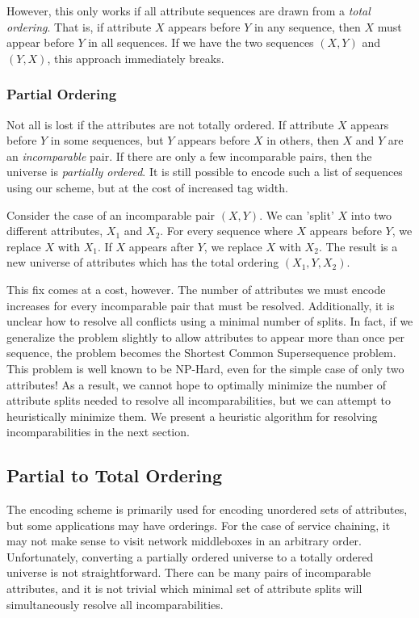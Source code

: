 However, this only works if all attribute sequences are drawn from a \textit{total ordering}. That is, if attribute $X$ appears before $Y$ in any sequence, then $X$ must appear before $Y$ in all sequences. If we have the two sequences $(X, Y)$ and $(Y, X)$, this approach immediately breaks.

\subsubsection{Partial Ordering}
Not all is lost if the attributes are not totally ordered. If attribute $X$ appears before $Y$ in some sequences, but $Y$ appears before $X$ in others, then $X$ and $Y$ are an \textit{incomparable} pair. If there are only a few incomparable pairs, then the universe is \textit{partially ordered}. It is still possible to encode such a list of sequences using our scheme, but at the cost of increased tag width.

Consider the case of an incomparable pair $(X,Y)$. We can 'split' $X$ into two different attributes, $X_1$ and $X_2$. For every sequence where $X$ appears before $Y$, we replace $X$ with $X_1$. If $X$ appears after $Y$, we replace $X$ with $X_2$. The result is a new universe of attributes which has the total ordering $(X_1, Y, X_2)$. 

This fix comes at a cost, however. The number of attributes we must encode increases for every incomparable pair that must be resolved. Additionally, it is unclear how to resolve all conflicts using a minimal number of splits. In fact, if we generalize the problem slightly to allow attributes to appear more than once per sequence, the problem becomes the Shortest Common Supersequence problem. This problem is well known to be NP-Hard, even for the simple case of only two attributes! As a result, we cannot hope to optimally minimize the number of attribute splits needed to resolve all incomparabilities, but we can attempt to heuristically minimize them. We present a heuristic algorithm for resolving incomparabilities in the next section.

\subsection{Partial to Total Ordering}
The encoding scheme is primarily used for encoding unordered sets of attributes, but some applications may have orderings. For the case of service chaining, it may not make sense to visit network middleboxes in an arbitrary order. 
Unfortunately, converting a partially ordered universe to a totally ordered universe is not straightforward. There can be many pairs of incomparable attributes, and it is not trivial which minimal set of attribute splits will simultaneously resolve all incomparabilities. 


